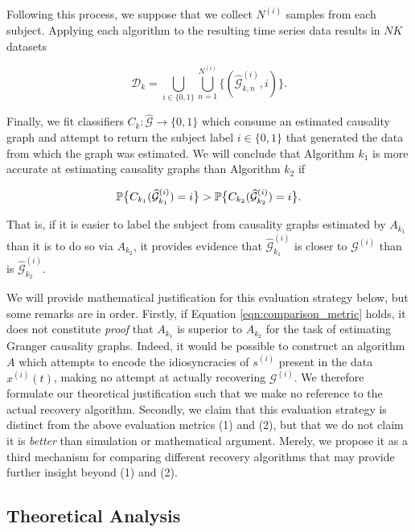 \documentclass[12pt]{article}
\def\gcg{\mathcal{G}}  %
\begin{document}
Following this process, we suppose that we collect $N^{(i)}$ samples
from each subject.  Applying each algorithm to the resulting time
series data results in $NK$ datasets

\[
  \mathcal{D}_k = \bigcup_{i \in \{0, 1\}} \bigcup_{n = 1}^{N^{(i)}} \{(\widehat{\gcg}_{k, n}^{(i)}, i)\}.
\]

Finally, we fit classifiers $C_k: \widehat{\gcg} \rightarrow \{0, 1\}$
which consume an estimated causality graph and attempt to return the
subject label $i \in \{0, 1\}$ that generated the data from which the
graph was estimated.  We will conclude that Algorithm $k_1$ is more
accurate at estimating causality graphs than Algorithm $k_2$ if

\begin{equation}
  \label{eqn:comparison_metric}
  \P\big\{C_{k_1}(\widehat{\gcg}_{k_1}^{(i)}) = i\big\} > \P\big\{C_{k_2}(\widehat{\gcg}_{k_2}^{(i)}) = i\big\}.
\end{equation}

That is, if it is easier to label the subject from causality graphs
estimated by $A_{k_1}$ than it is to do so via $A_{k_2}$, it provides
evidence that $\widehat{\gcg}_{k_1}^{(i)}$ is closer to
$\gcg^{(i)}$ than is $\widehat{\gcg}_{k_2}^{(i)}$.

\begin{remark}
We will provide mathematical justification for this evaluation
strategy below, but some remarks are in order.  Firstly, if Equation
\ref{eqn:comparison_metric} holds, it does not constitute
\textit{proof} that $A_{k_1}$ is superior to $A_{k_2}$ for the task of
estimating Granger causality graphs.  Indeed, it would be possible to
construct an algorithm $A$ which attempts to encode the idiosyncracies
of $s^{(i)}$ present in the data $x^{(i)}(t)$, making no attempt at
actually recovering $\gcg^{(i)}$.  We therefore formulate our
theoretical justification such that we make no reference to the actual
recovery algorithm.  Secondly, we claim that this evaluation strategy
is distinct from the above evaluation metrics (1) and (2), but that we
do not claim it is \textit{better} than simulation or mathematical
argument.  Merely, we propose it as a third mechanism for comparing
different recovery algorithms that may provide further insight beyond
(1) and (2).
\end{remark}

\subsection{Theoretical Analysis}
\end{document}
